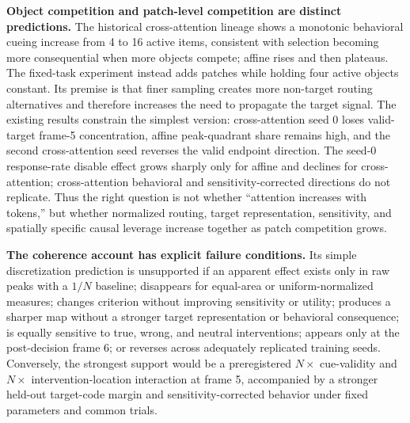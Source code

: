 \documentclass[10pt]{article}
\begin{document}
\textbf{Object competition and patch-level competition are distinct predictions.} The historical cross-attention lineage shows a monotonic behavioral cueing increase from 4 to 16 active items, consistent with selection becoming more consequential when more objects compete; affine rises and then plateaus. The fixed-task experiment instead adds patches while holding four active objects constant. Its premise is that finer sampling creates more non-target routing alternatives and therefore increases the need to propagate the target signal. The existing results constrain the simplest version: cross-attention seed 0 loses valid-target frame-5 concentration, affine peak-quadrant share remains high, and the second cross-attention seed reverses the valid endpoint direction. The seed-0 response-rate disable effect grows sharply only for affine and declines for cross-attention; cross-attention behavioral and sensitivity-corrected directions do not replicate. Thus the right question is not whether ``attention increases with tokens,'' but whether normalized routing, target representation, sensitivity, and spatially specific causal leverage increase together as patch competition grows.

\textbf{The coherence account has explicit failure conditions.} Its simple discretization prediction is unsupported if an apparent effect exists only in raw peaks with a $1/N$ baseline; disappears for equal-area or uniform-normalized measures; changes criterion without improving sensitivity or utility; produces a sharper map without a stronger target representation or behavioral consequence; is equally sensitive to true, wrong, and neutral interventions; appears only at the post-decision frame 6; or reverses across adequately replicated training seeds. Conversely, the strongest support would be a preregistered $N\times$ cue-validity and $N\times$ intervention-location interaction at frame 5, accompanied by a stronger held-out target-code margin and sensitivity-corrected behavior under fixed parameters and common trials.
\end{document}
